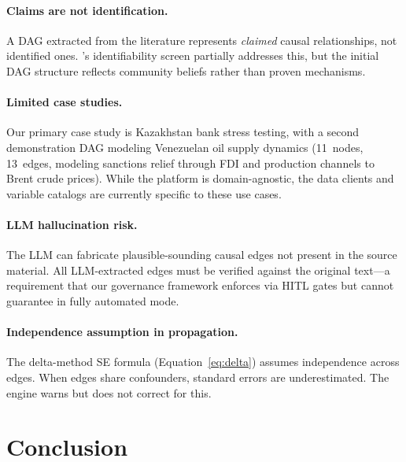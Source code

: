 \documentclass{article}
\begin{document}
\paragraph{Claims are not identification.}
A DAG extracted from the literature represents \emph{claimed} causal relationships, not identified ones. \oc{}'s identifiability screen partially addresses this, but the initial DAG structure reflects community beliefs rather than proven mechanisms.

\paragraph{Limited case studies.}
Our primary case study is Kazakhstan bank stress testing, with a second demonstration DAG modeling Venezuelan oil supply dynamics (11~nodes, 13~edges, modeling sanctions relief through FDI and production channels to Brent crude prices). While the platform is domain-agnostic, the data clients and variable catalogs are currently specific to these use cases.

\paragraph{LLM hallucination risk.}
The LLM can fabricate plausible-sounding causal edges not present in the source material. All LLM-extracted edges must be verified against the original text---a requirement that our governance framework enforces via HITL gates but cannot guarantee in fully automated mode.

\paragraph{Independence assumption in propagation.}
The delta-method SE formula (Equation~\ref{eq:delta}) assumes independence across edges. When edges share confounders, standard errors are underestimated. The engine warns but does not correct for this.

\section{Conclusion}
\label{sec:conclusion}
\end{document}
